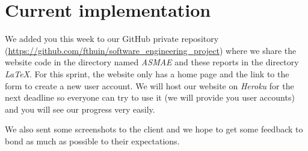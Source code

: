 
\section{Current implementation}

We added you this week to our GitHub private repository
(\url{https://github.com/fthuin/software_engineering_project}) where we
share the website code in the directory named \textit{ASMAE} and these reports in the
directory \textit{LaTeX}. For this sprint, the website only has a home page
and the link to the form to create a new user account. We will host
our website on \textit{Heroku} for the next deadline so everyone can try to
use it (we will provide you user accounts) and you will see our progress
very easily. \newline

We also sent some screenshots to the client and we hope to get some
feedback to bond as much as possible to their expectations. \newline
